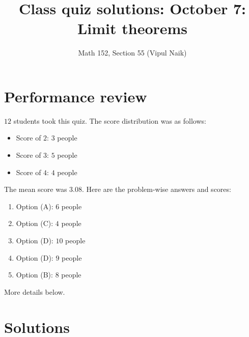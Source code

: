 \documentclass[10pt]{amsart}
\title{Class quiz solutions: October 7: Limit theorems}
\author{Math 152, Section 55 (Vipul Naik)}
\begin{document}
\maketitle

\section{Performance review}

$12$ students took this quiz. The score distribution was as follows:

\begin{itemize}
\item Score of $2$: $3$ people
\item Score of $3$: $5$ people
\item Score of $4$: $4$ people
\end{itemize}

The mean score was $3.08$. Here are the problem-wise answers and
scores:

\begin{enumerate}
\item Option (A): $6$ people
\item Option (C): $4$ people
\item Option (D): $10$ people
\item Option (D): $9$ people
\item Option (B): $8$ people
\end{enumerate}

More details below.

\section{Solutions}
\end{document}
